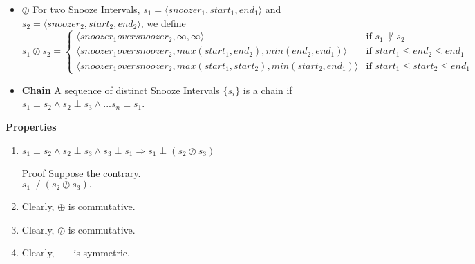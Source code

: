 \documentclass[fleqn]{article}
\newcommand{\triple}[3]{\langle #1,#2,#3 \rangle}
\newcommand{\iunion}{\oplus}
\newcommand{\iinter}{\oslash}
\newcommand{\ioverlap}{\perp}
\begin{document}
\begin{itemize}
  \item \textbf{$\iinter$}
    For two Snooze Intervals,
    $s_1=\triple{snoozer_1}{start_1}{end_1}$ and
    $s_2=\triple{snoozer_2}{start_2}{end_2}$, we define
    $s_1 \iinter s_2 =
       \begin{cases}
         \triple{snoozer_1 over snoozer_2}{\infty}{\infty} &
           \text{if } s_1 \not\ioverlap s_2\\
         \triple{snoozer_1 over snoozer_2}{max(start_1,end_2)}
                                          {min(end_2, end_1)} &
           \text{if } start_1 \leq end_2 \leq end_1\\
         \triple{snoozer_1 over snoozer_2}{max(start_1,start_2)}
                                   {min(start_2,end_1)} &
           \text{if } start_1 \leq start_2 \leq end_1
       \end{cases}$
  \item \textbf{Chain} A sequence of distinct Snooze Intervals $\lbrace s_i \rbrace$ is a chain if $s_1 \ioverlap s_2 \wedge s_2 \ioverlap s_3 \wedge ... s_n \ioverlap s_1$.
\end{itemize}

\textbf{Properties}
\begin{enumerate}
  \item $s_1 \ioverlap s_2 \wedge
         s_2 \ioverlap s_3 \wedge
         s_3 \ioverlap s_1 \Rightarrow
         s_1 \ioverlap (s_2 \iinter s_3)$

        \underline{Proof}
        Suppose the contrary.\\
        $s_1 \not\ioverlap (s_2 \iinter s_3).$
   \item Clearly, $\iunion$ is commutative.
   \item Clearly, $\iinter$ is commutative.
   \item Clearly, $\ioverlap$ is symmetric.
\end{enumerate}
\end{document}
